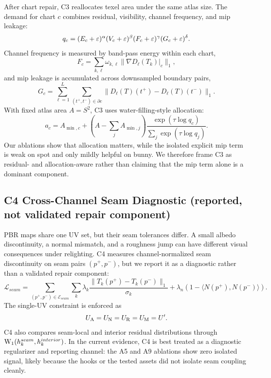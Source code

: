 After chart repair, C3 reallocates texel area under the same atlas size. The demand for chart \(c\) combines residual, visibility, channel frequency, and mip leakage:
\begin{equation}
q_c=(E_c+\varepsilon)^{\alpha}(V_c+\varepsilon)^{\beta}
(F_c+\varepsilon)^{\gamma}(G_c+\varepsilon)^{\delta}.
\label{eq:demand}
\end{equation}
Channel frequency is measured by band-pass energy within each chart,
\begin{equation}
F_c=\sum_{k,\ell}\omega_{k,\ell}\|\nabla D_\ell(T_k)|_c\|_1,
\label{eq:frequency}
\end{equation}
and mip leakage is accumulated across downsampled boundary pairs,
\begin{equation}
G_c=\sum_{\ell=1}^{L}\sum_{(t^+,t^-)\in\partial c}
\|D_\ell(T)(t^+)-D_\ell(T)(t^-)\|_1.
\label{eq:mip_leakage}
\end{equation}
With fixed atlas area \(A=S^2\), C3 uses water-filling-style allocation:
\begin{equation}
a_c=A_{\min,c}+
\left(A-\sum_jA_{\min,j}\right)
\frac{\exp(\tau\log q_c)}{\sum_j\exp(\tau\log q_j)}.
\label{eq:allocation}
\end{equation}
Our ablations show that allocation matters, while the isolated explicit mip term is weak on spot and only mildly helpful on bunny. We therefore frame C3 as residual- and allocation-aware rather than claiming that the mip term alone is a dominant component.

\subsection{C4 Cross-Channel Seam Diagnostic (reported, not validated repair component)}
\label{sec:c4}

PBR maps share one UV set, but their seam tolerances differ. A small albedo discontinuity, a normal mismatch, and a roughness jump can have different visual consequences under relighting. C4 measures channel-normalized seam discontinuity on seam pairs \((p^+,p^-)\), but we report it as a diagnostic rather than a validated repair component:
\begin{equation}
\mathcal{L}_{seam}=
\sum_{(p^+,p^-)\in\mathcal{E}_{seam}}
\sum_k\lambda_k
\frac{\|T_k(p^+)-T_k(p^-)\|_1}{\sigma_k}
+\lambda_n(1-\langle N(p^+),N(p^-)\rangle).
\label{eq:seam}
\end{equation}
The single-UV constraint is enforced as
\begin{equation}
U_{\mathrm{A}}=U_{\mathrm{N}}=U_{\mathrm{R}}=U_{\mathrm{M}}=U'.
\label{eq:single_uv}
\end{equation}
C4 also compares seam-local and interior residual distributions through \(\mathrm{W}_1(h_k^{seam},h_k^{interior})\). In the current evidence, C4 is best treated as a diagnostic regularizer and reporting channel: the A5 and A9 ablations show zero isolated signal, likely because the hooks or the tested assets did not isolate seam coupling cleanly.

